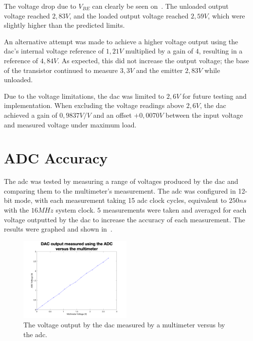 The voltage drop due to $V_{BE}$ can clearly be seen on~.
The unloaded output voltage reached $2,83V$, and the loaded output voltage reached $2,59V$, which were slightly higher than the predicted limits.

An alternative attempt was made to achieve a higher voltage output using the \gls{dac}'s internal voltage reference of $1,21V$ multiplied by a gain of $4$, resulting in a reference of $4,84V$.
As expected, this did not increase the output voltage; the base of the transistor continued to measure $3,3V$ and the emitter $2,83V$ while unloaded.

Due to the voltage limitations, the \gls{dac} was limited to $2,6V$ for future testing and implementation.
When excluding the voltage readings above $2,6V$, the \gls{dac} achieved a gain of $0,9837V/V$ and an offset $+0,0070V$ between the input voltage and measured voltage under maximum load. 
\section{ADC Accuracy}\label{sec:adc-accuracy}

The \gls{adc} was tested by measuring a range of voltages produced by the \gls{dac} and comparing them to the multimeter's measurement.
The \gls{adc} was configured in 12-bit mode, with each measurement taking 15 \gls{adc} clock cycles, equivalent to $250ns$ with the $16MHz$ system clock.
$5$ measurements were taken and averaged for each voltage outputted by the \gls{dac} to increase the accuracy of each measurement.
The results were graphed and shown in~. 

\begin{figure}[ht]
    \centering
    \includegraphics[width=0.5\textwidth]{Figures/Testing/ADC}
    \caption{The voltage output by the \gls{dac} measured by a multimeter versus by the \gls{adc}.}
    \label{fig:adc-accuracy} %
\end{figure}

